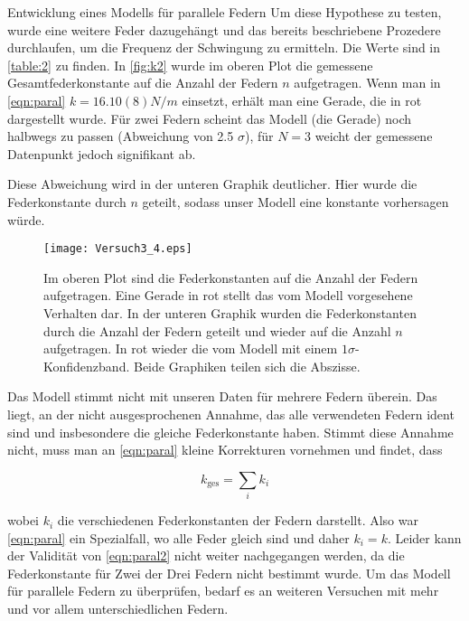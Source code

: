 \documentclass{alex_gp}
\begin{document}
\begin{mybox}{Entwicklung eines Modells für parallele Federn}
	Um diese Hypothese zu testen, wurde eine weitere Feder dazugehängt und das bereits beschriebene Prozedere durchlaufen, um die Frequenz der Schwingung zu ermitteln. Die Werte sind in  \autoref{table:2} zu finden. In \autoref{fig:k2} wurde im oberen Plot die gemessene Gesamtfederkonstante auf die Anzahl der Federn \( n \) aufgetragen. Wenn man in \autoref{eqn:paral} \( k = 16.10(8)  \unit{N/m} \) einsetzt, erhält man eine Gerade, die in rot dargestellt wurde. Für zwei Federn scheint das Modell (die Gerade) noch halbwegs zu passen (Abweichung von 2.5 $\sigma$), für \( N = 3 \) weicht der gemessene Datenpunkt jedoch signifikant ab. 
	
	Diese Abweichung wird in der unteren Graphik deutlicher. Hier wurde die Federkonstante durch \( n \) geteilt, sodass unser Modell eine konstante vorhersagen würde. 
	
	\begin{figure}[H]
		\centering
		\texttt{[image: Versuch3\_4.eps]}
		\caption{Im oberen Plot sind die Federkonstanten auf die Anzahl der Federn aufgetragen. Eine Gerade in rot stellt das vom Modell vorgesehene Verhalten dar. In der unteren Graphik wurden die Federkonstanten durch die Anzahl der Federn geteilt und wieder auf die Anzahl \( n \) aufgetragen. In rot wieder die vom Modell mit einem \( 1\sigma \)-Konfidenzband. Beide Graphiken teilen sich die Abszisse.}
		\label{fig:k2}
	\end{figure}
	
	Das Modell stimmt nicht mit unseren Daten für mehrere Federn überein. Das liegt, an der nicht ausgesprochenen Annahme, das alle verwendeten Federn ident sind und insbesondere die gleiche Federkonstante haben. Stimmt diese Annahme nicht, muss man an \autoref{eqn:paral} kleine Korrekturen vornehmen und findet, dass
	
	\begin{equation}\label{eqn:paral2}
		k_{\text{ges}} = \sum_{i} k_i
	\end{equation}

	wobei \( k_i \) die verschiedenen Federkonstanten der Federn darstellt. Also war \autoref{eqn:paral} ein Spezialfall, wo alle Feder gleich sind und daher \( k_i = k \). Leider kann der Validität von \autoref{eqn:paral2} nicht weiter nachgegangen werden, da die Federkonstante für Zwei der Drei Federn nicht bestimmt wurde.
	Um das Modell für parallele Federn zu überprüfen, bedarf es an weiteren Versuchen mit mehr und vor allem unterschiedlichen Federn.

\end{mybox}
\end{document}
